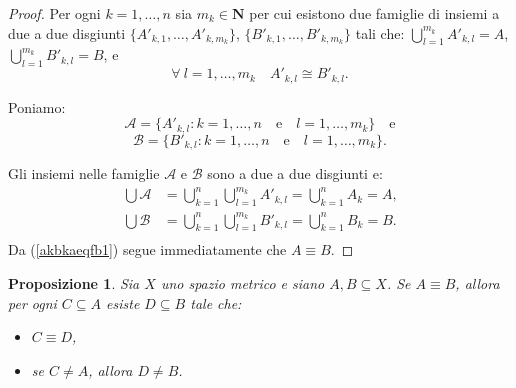 \documentclass[a4paper,oneside,11pt]{book}
\theoremstyle{definition} \newtheorem{Def}{Definizione}
\theoremstyle{plain} \newtheorem{teo}{Teorema}
\theoremstyle{plain} \newtheorem{cor}[teo]{Corollario}
\theoremstyle{definition} \newtheorem{lem}[teo]{Lemma}
\theoremstyle{plain} \newtheorem{pro}[teo]{Proposizione}
\newcommand{\eqf}{\equiv}
\newcommand{\ug}[1]{(\ref{#1})} %
\begin{document}
	\begin{proof}
		Per ogni $k = 1, \dots, n$ sia $m_k \in \mathbf{N}$ per cui esistono due famiglie di insiemi a due a due disgiunti $\{A'_{k,1}, \dots, A'_{k,m_k}\}$, $\{B'_{k,1}, \dots, B'_{k,m_k}\}$ tali che: $\bigcup\limits_{l=1}^{m_k} A'_{k,l} = A$, $\bigcup\limits_{l=1}^{m_k} B'_{k,l} = B$, e
		\begin{equation}\label{akbkaeqfb1}
			\forall\ l = 1, \dots, m_k \quad A'_{k,l} \cong B'_{k,l} \text{.}
		\end{equation}
		
		Poniamo:
		\begin{equation*}
			\mathcal{A} = \{A'_{k,l} : k = 1, \dots, n \quad \text{e} \quad l = 1, \dots, m_k\} \quad\text{e}
		\end{equation*}
		\begin{equation*}
			\mathcal{B} = \{B'_{k,l} : k = 1, \dots, n \quad \text{e} \quad l = 1, \dots, m_k\} \text{.}
		\end{equation*}
		
		Gli insiemi nelle famiglie $\mathcal{A}$ e $\mathcal{B}$ sono a due a due disgiunti e:
		\begin{equation*}
			\begin{aligned}
				\bigcup \mathcal{A} &= \bigcup_{k=1}^n \bigcup_{l=1}^{m_k} A'_{k,l} = \bigcup_{k=1}^n A_k = A \text{,}\\
				\bigcup \mathcal{B} &= \bigcup_{k=1}^n \bigcup_{l=1}^{m_k} B'_{k,l} = \bigcup_{k=1}^n B_k = B \text{.}\\
			\end{aligned}
		\end{equation*}
		Da \ug{akbkaeqfb1} segue immediatamente che $A \eqf B$.
	\end{proof}
	
	\begin{pro}\label{aeqfbcadb}%
		Sia $X$ uno spazio metrico e siano $A, B \subseteq X$. Se $A \eqf B$, allora per ogni $C \subseteq A$ esiste $D \subseteq B$ tale che:
		\begin{itemize}
			\item $C \eqf D$,
			\item se $C \neq A$, allora $D \neq B$.
		\end{itemize}
	\end{pro}
	
\end{document}
